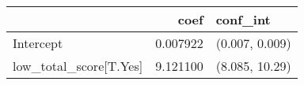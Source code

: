 \begin{tabular}{lrl}
\toprule
{} &      coef &        conf\_int \\
\midrule
Intercept              &  0.007922 &  (0.007, 0.009) \\
low\_total\_score[T.Yes] &  9.121100 &  (8.085, 10.29) \\
\bottomrule
\end{tabular}
